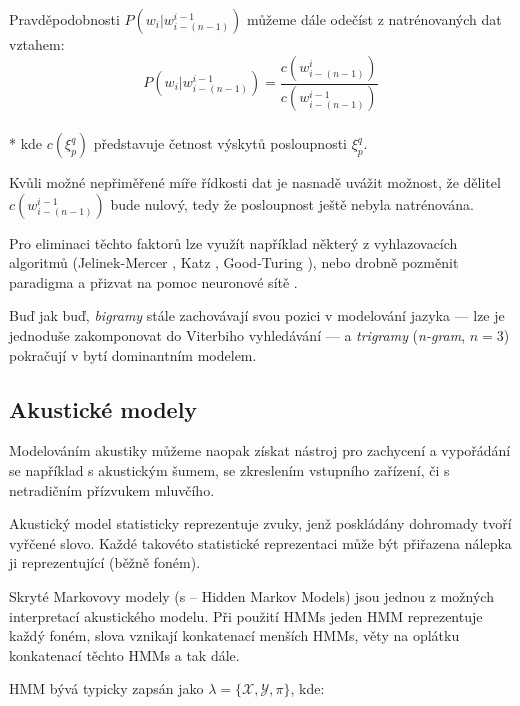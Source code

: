 Pravděpodobnosti $P(w_i|w_{i-(n-1)}^{i-1})$ můžeme dále odečíst z natrénovaných dat vztahem:
%
\begin{equation}
	\label{eq:lm_est}
	P(w_i|w_{i-(n-1)}^{i-1}) = \frac{c(w_{i-(n-1)}^{i})}{c(w_{i-(n-1)}^{i-1})}
\end{equation}
\\*
kde $c(\xi_p^q)$ představuje četnost výskytů posloupnosti $\xi_p^q$.

Kvůli možné nepřiměřené míře řídkosti dat je nasnadě uvážit možnost, že dělitel $c(w_{i-(n-1)}^{i-1})$ bude nulový, tedy že posloupnost ještě nebyla natrénována. 

Pro eliminaci těchto faktorů lze využít například některý z vyhlazovacích algoritmů (Jelinek-Mercer \cite{jelinek_1980}, Katz \cite{katz_1987}, Good-Turing \cite{church_1991}), nebo drobně pozměnit paradigma a přizvat na pomoc neuronové sítě \cite{chienli_2013}.

Buď jak buď, {\sl bigramy} stále zachovávají svou pozici v modelování jazyka --- lze je jednoduše zakomponovat do Viterbiho vyhledávání \cite{goblirsch_1996} --- a {\sl trigramy} ({\sl n-gram}, $n=3$) pokračují v bytí dominantním modelem.

\subsection{Akustické modely}

Modelováním akustiky můžeme naopak získat nástroj pro zachycení a vypořádání se například s akustickým šumem, se zkreslením vstupního zařízení, či s netradičním přízvukem mluvčího.

Akustický model statisticky reprezentuje zvuky, jenž poskládány dohromady tvoří vyřčené slovo. Každé takovéto statistické reprezentaci může být přiřazena nálepka ji reprezentující (běžně foném).

Skryté Markovovy modely (s -- Hidden Markov Models) \cite{poritz_1988} jsou jednou z možných interpretací akustického modelu. Při použití HMMs jeden HMM reprezentuje každý foném, slova vznikají konkatenací menších HMMs, věty na oplátku konkatenací těchto HMMs a tak dále.

HMM bývá typicky zapsán jako $\lambda = \{\mathcal{X}, \mathcal{Y}, \pi\}$, kde:

